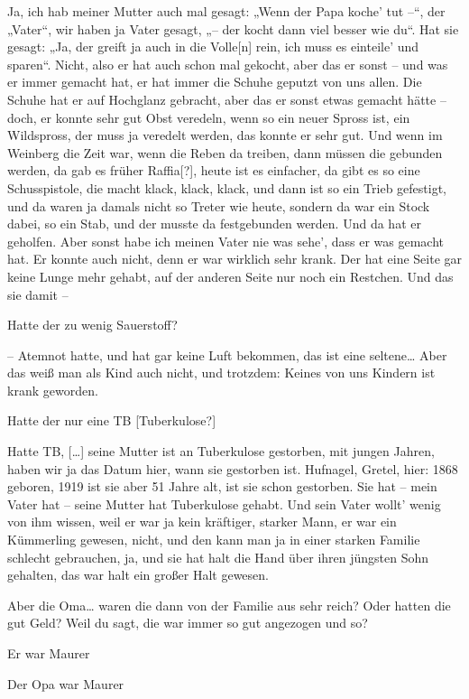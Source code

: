 \documentclass[ngerman,]{article}
\providecommand{\tightlist}{%
  \setlength{\itemsep}{0pt}\setlength{\parskip}{0pt}}
\begin{document}
\begin{multicols}{2}
\begin{description}
\tightlist
\item[Käthe]
Ja, ich hab meiner Mutter auch mal gesagt: „Wenn der Papa koche' tut –“,
der „Vater“, wir haben ja Vater gesagt, „– der kocht dann viel besser
wie du“. Hat sie gesagt: „Ja, der greift ja auch in die Volle{[}n{]}
rein, ich muss es einteile' und sparen“. Nicht, also er hat auch schon
mal gekocht, aber das er sonst – und was er immer gemacht hat, er hat
immer die Schuhe geputzt von uns allen. Die Schuhe hat er auf Hochglanz
gebracht, aber das er sonst etwas gemacht hätte – doch, er konnte sehr
gut Obst veredeln, wenn so ein neuer Spross ist, ein Wildspross, der
muss ja veredelt werden, das konnte er sehr gut. Und wenn im Weinberg
die Zeit war, wenn die Reben da treiben, dann müssen die gebunden
werden, da gab es früher Raffia{[}?{]}, heute ist es einfacher, da gibt
es so eine Schusspistole, die macht klack, klack, klack, und dann ist so
ein Trieb gefestigt, und da waren ja damals nicht so Treter wie heute,
sondern da war ein Stock dabei, so ein Stab, und der musste da
festgebunden werden. Und da hat er geholfen. Aber sonst habe ich meinen
Vater nie was sehe', dass er was gemacht hat. Er konnte auch nicht, denn
er war wirklich sehr krank. Der hat eine Seite gar keine Lunge mehr
gehabt, auf der anderen Seite nur noch ein Restchen. Und das sie damit –
\item[Ruth]
Hatte der zu wenig Sauerstoff?
\item[Käthe]
– Atemnot hatte, und hat gar keine Luft bekommen, das ist eine
seltene\ldots{} Aber das weiß man als Kind auch nicht, und trotzdem:
Keines von uns Kindern ist krank geworden.
\item[Ruth]
Hatte der nur eine TB {[}Tuberkulose?{]}
\item[Käthe]
Hatte TB, {[}\ldots{}{]} seine Mutter ist an Tuberkulose gestorben, mit
jungen Jahren, haben wir ja das Datum hier, wann sie gestorben ist.
Hufnagel, Gretel, hier: 1868 geboren, 1919 ist sie aber 51 Jahre alt,
ist sie schon gestorben. Sie hat – mein Vater hat – seine Mutter hat
Tuberkulose gehabt. Und sein Vater wollt' wenig von ihm wissen, weil er
war ja kein kräftiger, starker Mann, er war ein Kümmerling gewesen,
nicht, und den kann man ja in einer starken Familie schlecht gebrauchen,
ja, und sie hat halt die Hand über ihren jüngsten Sohn gehalten, das war
halt ein großer Halt gewesen.
\item[Ruth]
Aber die Oma\ldots{} waren die dann von der Familie aus sehr reich? Oder
hatten die gut Geld? Weil du sagt, die war immer so gut angezogen und
so?
\item[Käthe]
Er war Maurer
\item[Ruth]
Der Opa war Maurer
\end{description}


\end{multicols}
\end{document}
